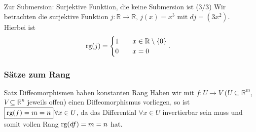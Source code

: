 \begin{Beispiel}
{Zur Submersion: Surjektive Funktion{,} die keine Submersion ist (3/3)}
Wir betrachten die surjektive Funktion $j:\mathbb{R}\to\mathbb{R},\,\boxed{j(x)=x^3}$ mit $dj=(3x^2)$. Hierbei ist
\begin{equation*}
    \text{rg}(j)=\begin{cases}1\quad & x\in\mathbb{R}\setminus\left\{0\right\}\\0&x=0\end{cases}.
\end{equation*}
\end{Beispiel}

\subsubsection{Sätze zum Rang}
\begin{Satz}{Satz}
{Diffeomorphismen haben konstanten Rang}
Haben wir mit $f:U\to V$ ($U\subseteq\mathbb{R}^m$, $V\subseteq\mathbb{R}^n$ jeweils offen) einen Diffeomorphismus vorliegen, so ist $\boxed{\text{rg}(f)=m=n}\,\forall x\in U$, da das Differential $\forall x\in U$ invertierbar sein muss und somit vollen Rang $\text{rg}(df)=m=n$ hat. 
\end{Satz}
